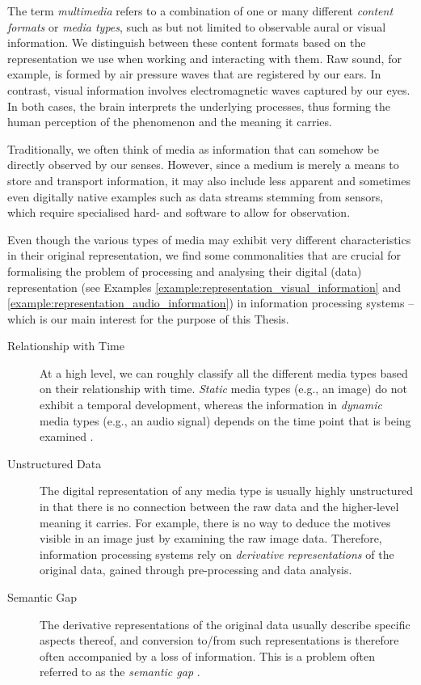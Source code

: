 The term \emph{multimedia} refers to a combination of one or many different \emph{content formats} or \emph{media types}, such as but not limited to observable aural or visual information. We distinguish between these content formats based on the representation we use when working and interacting with them. Raw sound, for example, is formed by air pressure waves that are registered by our ears. In contrast, visual information involves electromagnetic waves captured by our eyes. In both cases, the brain interprets the underlying processes, thus forming the human perception of the phenomenon and the meaning it carries.

Traditionally, we often think of media as information that can somehow be directly observed by our senses. However, since a medium is merely a means to store and transport information, it may also include less apparent and sometimes even digitally native examples such as data streams stemming from sensors, which require specialised hard- and software to allow for observation.

Even though the various types of media may exhibit very different characteristics in their original representation, we find some commonalities that are crucial for formalising the problem of processing and analysing their digital (data) representation (see Examples \ref{example:representation_visual_information} and \ref{example:representation_audio_information}) in information processing systems -- which is our main interest for the purpose of this Thesis.

\begin{description}
    \item[Relationship with Time] At a high level, we can roughly classify all the different media types based on their relationship with time. \emph{Static} media types (e.g., an image) do not exhibit a temporal development, whereas the information in \emph{dynamic} media types (e.g., an audio signal) depends on the time point that is being examined \cite{Blanken:2007multimedia}.

    \item[Unstructured Data] The digital representation of any media type is usually highly unstructured in that there is no connection between the raw data and the higher-level meaning it carries. For example, there is no way to deduce the motives visible in an image just by examining the raw image data. Therefore, information processing systems rely on \emph{derivative representations} of the original data, gained through pre-processing and data analysis.
    
    \item[Semantic Gap] The derivative representations of the original data usually describe specific aspects thereof, and conversion to/from such representations is therefore often accompanied by a loss of information. This is a problem often referred to as the \emph{semantic gap} \cite{Blanken:2007multimedia, Rossetto:2018Multi}.
\end{description}

